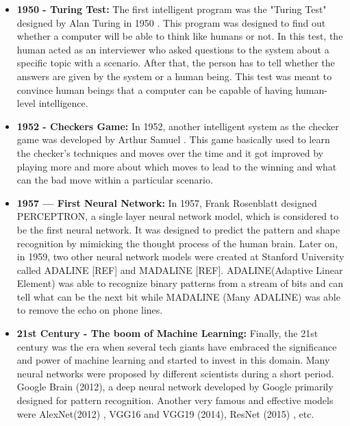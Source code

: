\begin{itemize}
  \item \textbf{1950 - Turing Test:} The first intelligent program was the "Turing Test" designed by Alan Turing in 1950 \cite{ml_history1}. This program was designed to find out whether a computer will be able to think like humans or not. In this test, the human acted as an interviewer who asked questions to the system about a specific topic with a scenario. After that, the person has to tell whether the answers are given by the system or a human being. This test was meant to convince human beings that a computer can be capable of having human-level intelligence.
  \item  \textbf{1952 - Checkers Game:} In 1952, another intelligent system as the checker game was developed by Arthur Samuel \cite{ml_history2}. This game basically used to learn the checker's techniques and moves over the time and it got improved by playing more and more about which moves to lead to the winning and what can the bad move within a particular scenario.
  \item  \textbf{1957 — First Neural Network:} In 1957, Frank Rosenblatt designed PERCEPTRON, a single layer neural network model, which is considered to be the first neural network. It was designed to predict the pattern and shape recognition by mimicking the thought process of the human brain. Later on, in 1959, two other neural network models were created at Stanford University called ADALINE [REF] and MADALINE [REF]. ADALINE(Adaptive Linear Element) was able to recognize binary patterns from a stream of bits and can tell what can be the next bit while MADALINE (Many ADALINE) was able to remove the echo on phone lines.
  \item  \textbf{21st Century - The boom of Machine Learning:} Finally, the 21st century was the era when several tech giants have embraced the significance and power of machine learning and started to invest in this domain. Many neural networks were proposed by different scientists during a short period. Google Brain (2012), a deep neural network developed by Google primarily designed for pattern recognition. Another very famous and effective models were AlexNet(2012) \cite{1803.01164}, VGG16 and VGG19 \cite{vgg_19} (2014), ResNet (2015) \cite{1512.03385}, etc.
\end{itemize}
